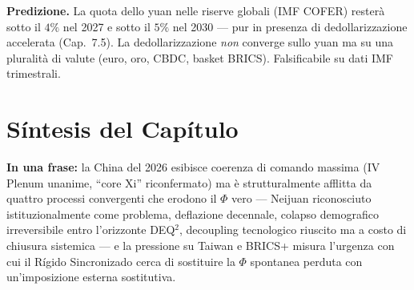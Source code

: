 \Conj{} \textbf{Predizione.} La quota dello yuan nelle riserve globali
(IMF COFER) resterà sotto il \(4\%\) nel 2027 e sotto il \(5\%\) nel
2030 --- pur in presenza di dedollarizzazione accelerata (Cap.~7.5). La
dedollarizzazione \emph{non} converge sullo yuan ma su una pluralità di
valute (euro, oro, CBDC, basket BRICS). Falsificabile su dati IMF
trimestrali.



\section{Síntesis del Capítulo}\label{sintesi-del-capítulo}

\Proved{} \textbf{In una frase:} la China del 2026 esibisce coerenza di
comando massima (IV Plenum unanime, ``core Xi'' riconfermato) ma è
strutturalmente afflitta da quattro processi convergenti che erodono il
\(\Phi\) vero --- Neijuan riconosciuto istituzionalmente come problema,
deflazione decennale, colapso demografico irreversibile entro
l'orizzonte DEQ$^2$, decoupling tecnologico riuscito ma a costo di chiusura
sistemica --- e la pressione su Taiwan e BRICS+ misura l'urgenza con cui
il Rígido Sincronizado cerca di sostituire la \(\Phi\) spontanea
perduta con un'imposizione esterna sostitutiva.

